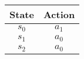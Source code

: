 \documentclass{standalone}
\begin{document}
\pagestyle{empty}
\begin{table}[h]
  \centering
  \begin{tabular}{|c | c|}
    \hline
    State & Action \\
    \hline
    $s_0$ & $a_1$ \\
    \hline
    $s_1$ & $a_0$ \\
    \hline
    $s_2$ & $a_0$ \\
    \hline
  \end{tabular}
\end{table}
\end{document}
